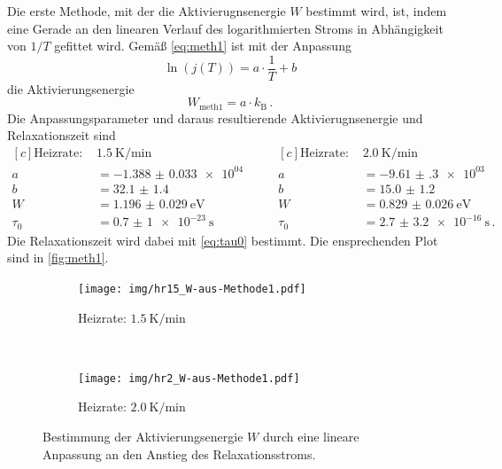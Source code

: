 Die erste Methode, mit der die Aktivierugnsenergie $W$ bestimmt wird, ist, indem eine Gerade an den linearen Verlauf des logarithmierten Stroms in Abhängigkeit von $1/T$ gefittet wird. Gemäß \autoref{eq:meth1} ist mit der Anpassung
\begin{equation}
  \ln{(j(T))} = a \cdot \frac{1}{T} + b
\end{equation}
die Aktivierungsenergie
\begin{equation*}
  W_\text{meth1} = a \cdot k_\text{B}\,.
\end{equation*}
Die Anpassungsparameter und daraus resultierende Aktivierugnsenergie und Relaxationszeit sind
\begin{equation*}
\begin{aligned}[c]
  \text{Heizrate: }& \SI{1.5}{\kelvin\per\minute}\\
  a &= \num{-1.388(33)e+04}\\
  b &= \num{32.1(14)}\\
  W &= \SI{1.196(29)}{\electronvolt}\\
  \tau_0 &= \SI{0.7(10)e-23}{\second}
\end{aligned}
\qquad
\begin{aligned}[c]
  \text{Heizrate: }& \SI{2.0}{\kelvin\per\minute}\\
  a &= \num{-9.61(30)e+03}\\
  b &= \num{15.0(12)}\\
  W &= \SI{0.829(26)}{\electronvolt}\\
  \tau_0 &= \SI{2.7(32)e-16}{\second}\,.
\end{aligned}
\end{equation*}
Die Relaxationszeit wird dabei mit \autoref{eq:tau0} bestimmt. Die ensprechenden Plot sind in \autoref{fig:meth1}.
\begin{figure}[htp]
    \centering
    \begin{subfigure}[t]{0.5\textwidth}
        \centering
        \texttt{[image: img/hr15\_W-aus-Methode1.pdf]}
        \caption{Heizrate: $\SI{1.5}{\kelvin\per\minute}$}
    \end{subfigure}%
    ~
    \begin{subfigure}[t]{0.5\textwidth}
        \centering
        \texttt{[image: img/hr2\_W-aus-Methode1.pdf]}
        \caption{Heizrate: $\SI{2.0}{\kelvin\per\minute}$}
    \end{subfigure}
    \caption{Bestimmung der Aktivierungsenergie $W$ durch eine lineare Anpassung an den Anstieg des Relaxationsstroms.}
    \label{fig:meth1}
\end{figure}


